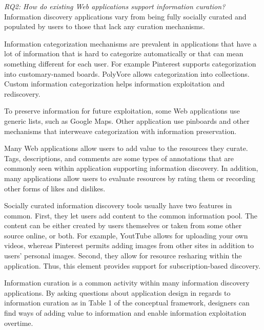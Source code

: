 \documentclass{casconpaper}
\begin{document}
{\emph{RQ2: How do existing Web applications support information curation?}\\

Information discovery applications vary from being fully socially curated and populated by users to those that lack any curation mechanisms. 

Information categorization mechanisms are prevalent in applications that have a lot of information that is hard to categorize automatically or that can mean something different for each user. For example Pinterest supports categorization into customary-named boards. PolyVore allows categorization into collections. Custom information categorization helps information exploitation and rediscovery. 

To preserve information for future exploitation, some Web applications use generic lists, such as Google Maps. Other application use pinboards and other mechanisms that interweave categorization with information preservation.  

Many Web applications allow users to add value to the resources they curate. Tags, descriptions, and comments are some types of annotations that are commonly seen within application supporting information discovery. In addition, many applications allow users to evaluate resources by rating them or recording other forms of likes and dislikes.

Socially curated information discovery tools usually have two features in common. First, they let users add content to the common information pool. The content can be either created by users themselves or taken from some other source online, or both. For example, YoutTube allows for uploading your own videos, whereas Pinterest permits adding images from other sites in addition to users' personal images. Second, they allow for resource resharing within the application. Thus, this element provides support for subscription-based discovery.

Information curation is a common activity within many information discovery applications. By asking questions about application design in regards to information curation as in Table 1 of the conceptual framework, designers can find ways of adding value to information and enable information exploitation overtime.  
 
} %
\end{document}
